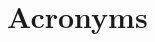 \documentclass[oneside,openany]{tufte-book} %
\begin{document}
\begin{spacing}{0.80}
    \tableofcontents %
\end{spacing}

\let\cleardoublepage\clearpage 

\listoffigures
\listoftables

\chapter*{Acronyms}
	\printacronyms[heading=none]


\mainmatter











\end{document}

